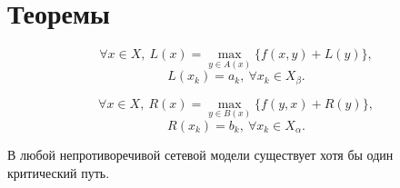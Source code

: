 \section{Теоремы}

\begin{theorem}[УБ "назад"]
  \[
    \forall x \in X, \ L(x) = \underset{y\in A(x)}{\max} \big\{f(x,y) + L(y)\big\},
  \]
  \[
    L(x_k) = a_k, \ \forall x_k \in X_{\beta } .
  \]
\end{theorem}

\begin{theorem}[УБ "вперед"]
	\[
		\forall x \in X, \ R(x) = \underset{y\in B(x)}{\max} \big\{f(y,x) + R(y)\big\},
	\]
	\[
		R(x_k) = b_k, \ \forall x_k \in X_{\alpha } .
	\]
\end{theorem}

\begin{theorem}
  В любой непротиворечивой сетевой модели существует хотя бы один критический путь.
\end{theorem}
